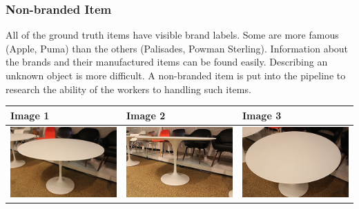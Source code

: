 \subsubsection{Non-branded Item}
All of the ground truth items have visible brand labels. Some are more famous (Apple, Puma) than the others (Palisades, Powman Sterling). Information about the brands and their manufactured items can be found easily. Describing an unknown object is more difficult. A non-branded item is put into the pipeline to research the ability of the workers to handling such items.
\begin{table}[h!]
	\begin{center}
	\begin{tabular}{| l | l | l |}
	\hline
	Image 1 & Image 2 & Image 3 \\
	\hline
	\includegraphics[scale=0.25]{images/ground_truth/8/image_1} & \includegraphics[scale=0.25]{images/ground_truth/8/image_2} & \includegraphics[scale=0.25]{images/ground_truth/8/image_3} \\

\end{tabular}
\end{center}
\end{table}
